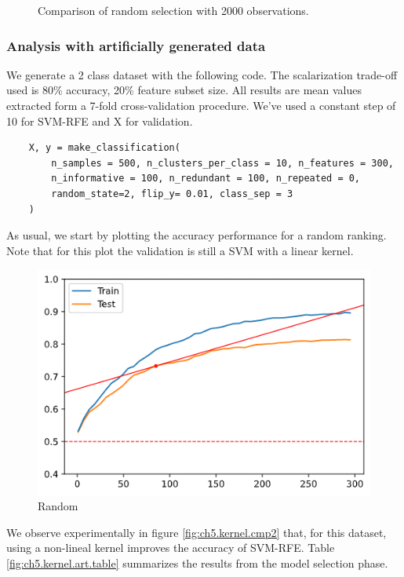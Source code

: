 \begin{figure}[h]
\begin{subfigure}[b]{0.32\linewidth}
    \end{subfigure}
    \caption[Non-linear kernel: Effects of changing the SVM implementation]{Comparison of random selection with 2000 observations.}
    \label{fig:ch5.kernel.cmp1}
\end{figure}

\subsubsection*{Analysis with artificially generated data}
\label{sec:ch5.kernel.art}

We generate a 2 class dataset with the following code.  The scalarization trade-off used is 80\% accuracy, 20\% feature subset size. All results are mean values extracted form a 7-fold cross-validation procedure. We've used a constant step of 10 for SVM-RFE and X for validation.

\begin{verbatim}
    X, y = make_classification(
        n_samples = 500, n_clusters_per_class = 10, n_features = 300, 
        n_informative = 100, n_redundant = 100, n_repeated = 0,
        random_state=2, flip_y= 0.01, class_sep = 3
    )
\end{verbatim}

As usual, we start by plotting the accuracy performance for a random ranking. Note that for this plot the validation is still a SVM with a linear kernel.

\begin{figure}[h]
    \centering
    \includegraphics[width=0.4\linewidth]{img/ch5/kernel/art_random.png}
    \caption[Non-linear kernel: Random feature selection]{Random}
    \label{fig:ch5.kernel.random}
\end{figure}

We observe experimentally in figure \ref{fig:ch5.kernel.cmp2} that, for this dataset, using a non-lineal kernel improves the accuracy of SVM-RFE. Table \ref{fig:ch5.kernel.art.table} summarizes the results from the model selection phase.

